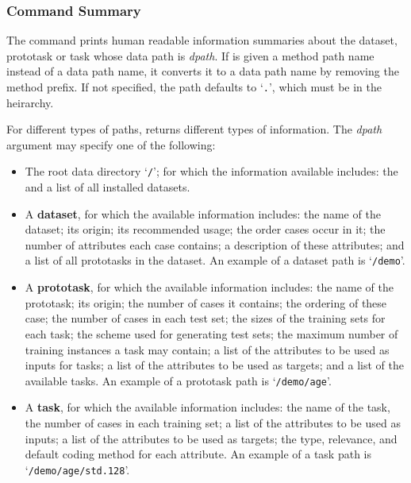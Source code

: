 \subsubsection*{Command Summary}

The \dinfo{} command prints human readable information summaries about
the \delve{} dataset, prototask or task whose data path is
\textit{dpath}.  If \dinfo{} is given a method path name instead of a
data path name, it converts it to a data path name by removing the
method prefix.  If not specified, the path defaults to `\texttt{.}',
which must be in the \delve{} heirarchy.

For different types of paths, \dinfo{} returns different types of
information. The \textit{dpath} argument may specify one of the
following:
\begin{itemize}
\item
    The root data directory `\texttt{/}'; for which the information
    available includes: the \delvepath{} and a list of all installed
    datasets.
\item
    A \textbf{dataset}, for which the available information includes:
    the name of the dataset; its origin; its recommended usage; the
    order cases occur in it; the number of attributes each case
    contains; a description of these attributes; and a list of all
    prototasks in the dataset. An example of a dataset path is
    `\texttt{/demo}'.
\item
    A \textbf{prototask}, for which the available information
    includes: the name of the prototask; its origin; the number of
    cases it contains; the ordering of these case; the number of cases
    in each test set; the sizes of the training sets for each task;
    the scheme used for generating test sets; the maximum number of
    training instances a task may contain; a list of the attributes to
    be used as inputs for tasks; a list of the attributes to be used
    as targets; and a list of the available tasks.  An example of a
    prototask path is `\texttt{/demo/age}'.
\item
    A \textbf{task}, for which the available information includes: the
    name of the task, the number of cases in each training set; a list
    of the attributes to be used as inputs; a list of the attributes
    to be used as targets; the type, relevance, and default coding
    method for each attribute.  An example of a task path is
    `\texttt{/demo/age/std.128}'.
\end{itemize}

